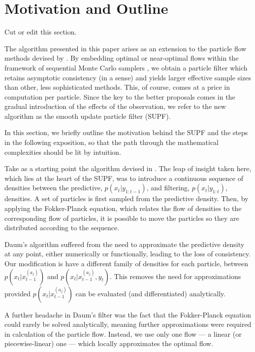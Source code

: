 \documentclass[a4paper,10pt]{article}
\begin{document}
\section{Motivation and Outline}

{\meta Cut or edit this section.}

The algorithm presented in this paper arises as an extension to the particle flow methods devised by \cite{Daum2008,Daum2011d,Reich2011}. By embedding optimal or near-optimal flows within the framework of sequential Monte Carlo samplers \cite{DelMoral2006}, we obtain a particle filter which retains asymptotic consistency (in a sense) and yields larger effective sample sizes than other, less sophisticated methods. This, of course, comes at a price in computation per particle. Since the key to the better proposals comes in the gradual introduction of the effects of the observation, we refer to the new algorithm as the smooth update particle filter (SUPF).

In this section, we briefly outline the motivation behind the SUPF and the steps in the following exposition, so that the path through the mathematical complexities should be lit by intuition.

Take as a starting point the algorithm devised in \cite{Daum2008}. The leap of insight taken here, which lies at the heart of the SUPF, was to introduce a continuous sequence of densities between the predictive, $p(x_t|y_{1:t-1})$, and filtering, $p(x_t|y_{1:t})$, densities. A set of particles is first sampled from the predictive density. Then, by applying the Fokker-Planck equation, which relates the flow of densities to the corresponding flow of particles, it is possible to move the particles so they are distributed according to the sequence.

Daum's algorithm suffered from the need to approximate the predictive density at any point, either numerically or functionally, leading to the loss of consistency. Our modification is have a different family of densities for each particle, between $p(x_t|x_{t-1}^{(a_j)})$ and $p(x_t|x_{t-1}^{(a_j)}, y_{t})$. This removes the need for approximations provided $p(x_t|x_{t-1}^{(a_j)})$ can be evaluated (and differentiated) analytically.

A further headache in Daum's filter was the fact that the Fokker-Planck equation could rarely be solved analytically, meaning further approximations were required in calculation of the particle flow. Instead, we use only one flow --- a linear (or piecewise-linear) one --- which locally approximates the optimal flow.
\end{document}
